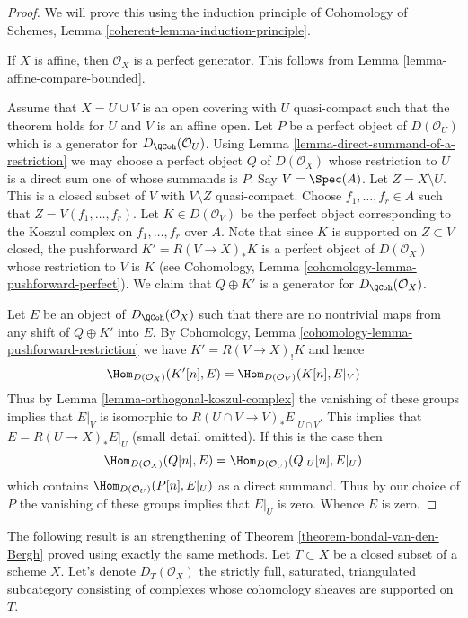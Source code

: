 \begin{proof}
We will prove this using the induction principle of
Cohomology of Schemes, Lemma \ref{coherent-lemma-induction-principle}.

\medskip\noindent
If $X$ is affine, then $\mathcal{O}_X$ is a perfect generator.
This follows from Lemma \ref{lemma-affine-compare-bounded}.

\medskip\noindent
Assume that $X = U \cup V$ is an open covering with $U$ quasi-compact
such that the theorem holds for $U$ and $V$ is an affine open.
Let $P$ be a perfect object of $D(\mathcal{O}_U)$ which is a generator
for $D_\QCoh(\mathcal{O}_U)$. Using
Lemma \ref{lemma-direct-summand-of-a-restriction} we may
choose a perfect object
$Q$ of $D(\mathcal{O}_X)$ whose restriction to $U$ is a direct sum one
of whose summands is $P$. Say $V = \Spec(A)$. Let $Z = X \setminus U$.
This is a closed subset of $V$ with $V \setminus Z$ quasi-compact.
Choose $f_1, \ldots, f_r \in A$ such that
$Z = V(f_1, \ldots, f_r)$. Let $K \in D(\mathcal{O}_V)$ be the perfect
object corresponding to the Koszul complex on $f_1, \ldots, f_r$ over $A$.
Note that since $K$ is supported on $Z \subset V$ closed, the pushforward
$K' = R(V \to X)_*K$ is a perfect object of $D(\mathcal{O}_X)$ whose
restriction to $V$ is $K$ (see
Cohomology, Lemma \ref{cohomology-lemma-pushforward-perfect}).
We claim that $Q \oplus K'$ is a generator for
$D_\QCoh(\mathcal{O}_X)$.

\medskip\noindent
Let $E$ be an object of $D_\QCoh(\mathcal{O}_X)$ such that
there are no nontrivial maps from any shift of $Q \oplus K'$ into $E$.
By Cohomology, Lemma \ref{cohomology-lemma-pushforward-restriction}
we have $K' =  R(V \to X)_! K$ and hence
$$
\Hom_{D(\mathcal{O}_X)}(K'[n], E) = \Hom_{D(\mathcal{O}_V)}(K[n], E|_V)
$$
Thus by Lemma \ref{lemma-orthogonal-koszul-complex} the vanishing of
these groups implies that $E|_V$ is isomorphic to
$R(U \cap V \to V)_*E|_{U \cap V}$. This implies that $E = R(U \to X)_*E|_U$
(small detail omitted). If this is the case then
$$
\Hom_{D(\mathcal{O}_X)}(Q[n], E) = \Hom_{D(\mathcal{O}_U)}(Q|_U[n], E|_U)
$$
which contains $\Hom_{D(\mathcal{O}_U)}(P[n], E|_U)$ as a direct summand.
Thus by our choice of $P$ the vanishing of these groups implies that $E|_U$
is zero. Whence $E$ is zero.
\end{proof}

\noindent
The following result is an strengthening of
Theorem \ref{theorem-bondal-van-den-Bergh}
proved using exactly the same methods.
Let $T \subset X$ be a closed subset of a scheme $X$.
Let's denote $D_T(\mathcal{O}_X)$ the strictly full, saturated,
triangulated subcategory consisting of complexes whose
cohomology sheaves are supported on $T$.

